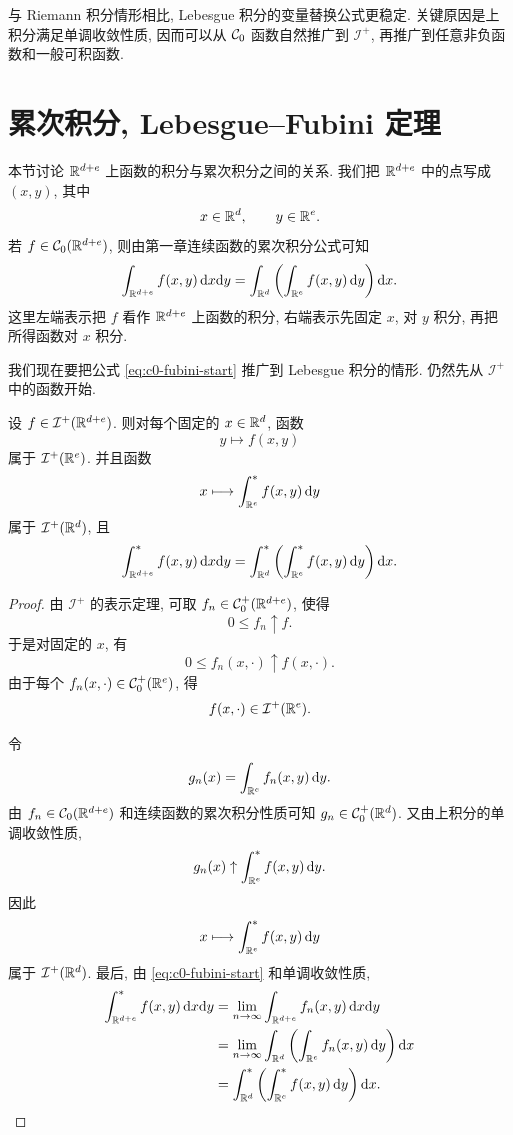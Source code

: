 \begin{rem}
	与 Riemann 积分情形相比, Lebesgue 积分的变量替换公式更稳定. 关键原因是上积分满足单调收敛性质, 因而可以从 \(\mathcal{C}_0\) 函数自然推广到 \(\mathcal I^+\), 再推广到任意非负函数和一般可积函数.
\end{rem}

\clearpage

\section{累次积分, Lebesgue--Fubini 定理}
\label{sec:iterated-integrals-lebesgue-fubini}

本节讨论 \(\mathbb{R}^{d+e}\) 上函数的积分与累次积分之间的关系. 我们把 \(\mathbb{R}^{d+e}\) 中的点写成 \((x,y)\), 其中
\[
x\in\mathbb{R}^d,\qquad y\in\mathbb{R}^e.
\]
若 \(f\in\mathcal{C}_0(\mathbb{R}^{d+e})\), 则由第一章连续函数的累次积分公式可知
\begin{equation}
	\int_{\mathbb{R}^{d+e}}f(x,y)\,\dd x\dd y
	=
	\int_{\mathbb{R}^d}\left(\int_{\mathbb{R}^e}f(x,y)\,\dd y\right)\dd x.
	\label{eq:c0-fubini-start}
\end{equation}
这里左端表示把 \(f\) 看作 \(\mathbb{R}^{d+e}\) 上函数的积分, 右端表示先固定 \(x\), 对 \(y\) 积分, 再把所得函数对 \(x\) 积分.

我们现在要把公式 \eqref{eq:c0-fubini-start} 推广到 Lebesgue 积分的情形. 仍然先从 \(\mathcal I^+\) 中的函数开始.

\begin{thm}\label{thm:i-plus-fubini}
	设 \(f\in\mathcal I^+(\mathbb{R}^{d+e})\). 则对每个固定的 \(x\in\mathbb{R}^d\), 函数
	\[
	y\longmapsto f(x,y)
	\]
	属于 \(\mathcal I^+(\mathbb{R}^e)\). 并且函数
	\[
	x\longmapsto \int_{\mathbb{R}^e}^{*}f(x,y)\,\dd y
	\]
	属于 \(\mathcal I^+(\mathbb{R}^d)\), 且
	\begin{equation}
		\int_{\mathbb{R}^{d+e}}^{*}f(x,y)\,\dd x\dd y
		=
		\int_{\mathbb{R}^d}^{*}\left(\int_{\mathbb{R}^e}^{*}f(x,y)\,\dd y\right)\dd x.
		\label{eq:i-plus-fubini}
	\end{equation}
\end{thm}

\begin{proof}
	由 \(\mathcal I^+\) 的表示定理, 可取 \(f_n\in\mathcal{C}_0^+(\mathbb{R}^{d+e})\), 使得
	\[
	0\leq f_n\uparrow f.
	\]
	于是对固定的 \(x\), 有
	\[
	0\leq f_n(x,\cdot)\uparrow f(x,\cdot).
	\]
	由于每个 \(f_n(x,\cdot)\in\mathcal{C}_0^+(\mathbb{R}^e)\), 得
	\[
	f(x,\cdot)\in\mathcal I^+(\mathbb{R}^e).
	\]
	
	令
	\[
	g_n(x)=\int_{\mathbb{R}^e}f_n(x,y)\,\dd y.
	\]
	由 \(f_n\in\mathcal{C}_0(\mathbb{R}^{d+e})\) 和连续函数的累次积分性质可知 \(g_n\in\mathcal{C}_0^+(\mathbb{R}^d)\). 又由上积分的单调收敛性质,
	\[
	g_n(x)\uparrow \int_{\mathbb{R}^e}^{*}f(x,y)\,\dd y.
	\]
	因此
	\[
	x\longmapsto \int_{\mathbb{R}^e}^{*}f(x,y)\,\dd y
	\]
	属于 \(\mathcal I^+(\mathbb{R}^d)\). 最后, 由 \eqref{eq:c0-fubini-start} 和单调收敛性质,
	\begin{align*}
		\int_{\mathbb{R}^{d+e}}^{*}f(x,y)\,\dd x\dd y
		&=\lim_{n\to\infty}\int_{\mathbb{R}^{d+e}}f_n(x,y)\,\dd x\dd y\\
		&=\lim_{n\to\infty}\int_{\mathbb{R}^d}\left(\int_{\mathbb{R}^e}f_n(x,y)\,\dd y\right)\dd x\\
		&=\int_{\mathbb{R}^d}^{*}\left(\int_{\mathbb{R}^e}^{*}f(x,y)\,\dd y\right)\dd x.
	\end{align*}
\end{proof}

